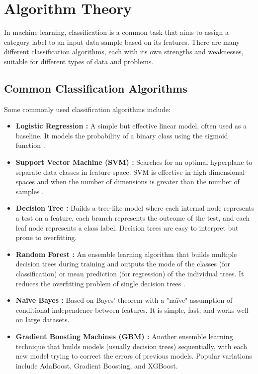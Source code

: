 \section{Algorithm Theory}

In machine learning, classification is a common task that aims to assign a category label to an input data sample based on its features. There are many different classification algorithms, each with its own strengths and weaknesses, suitable for different types of data and problems.

\subsection{Common Classification Algorithms}
Some commonly used classification algorithms include:
\begin{itemize}
    \item \textbf{Logistic Regression \cite{cortes1995support}:} A simple but effective linear model, often used as a baseline. It models the probability of a binary class using the sigmoid function \cite{cox1958regression}.
    \item \textbf{Support Vector Machine (SVM) \cite{cortes1995support}:} Searches for an optimal hyperplane to separate data classes in feature space. SVM is effective in high-dimensional spaces and when the number of dimensions is greater than the number of samples .
    \item \textbf{Decision Tree \cite{Patel_2018}:} Builds a tree-like model where each internal node represents a test on a feature, each branch represents the outcome of the test, and each leaf node represents a class label. Decision trees are easy to interpret but prone to overfitting.
    \item \textbf{Random Forest \cite{breiman2001random}:} An ensemble learning algorithm that builds multiple decision trees during training and outputs the mode of the classes (for classification) or mean prediction (for regression) of the individual trees. It reduces the overfitting problem of single decision trees \cite{breiman2001random}.
    \item \textbf{Naïve Bayes \cite{2000_Frank}:} Based on Bayes' theorem with a "naïve" assumption of conditional independence between features. It is simple, fast, and works well on large datasets.
    \item \textbf{Gradient Boosting Machines (GBM) \cite{friedman2001greedy}:} Another ensemble learning technique that builds models (usually decision trees) sequentially, with each new model trying to correct the errors of previous models. Popular variations include AdaBoost, Gradient Boosting, and XGBoost.
\end{itemize}

